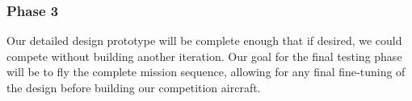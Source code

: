 \documentclass[proposal]{byu-aero}
\begin{document}
\subsubsection{Phase 3} Our detailed design prototype will be complete enough that if desired, we could compete without building another iteration. Our goal for the final testing phase will be to fly the complete mission sequence, allowing for any final fine-tuning of the design before building our competition aircraft.








{}

\end{document}
